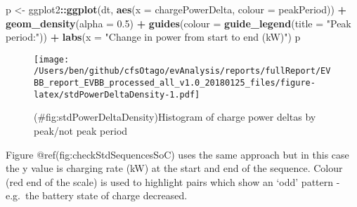 \documentclass[]{article}
\newenvironment{Shaded}{\begin{snugshade}}{\end{snugshade}}
\newcommand{\DataTypeTok}[1]{\textcolor[rgb]{0.13,0.29,0.53}{#1}}
\newcommand{\FloatTok}[1]{\textcolor[rgb]{0.00,0.00,0.81}{#1}}
\newcommand{\KeywordTok}[1]{\textcolor[rgb]{0.13,0.29,0.53}{\textbf{#1}}}
\newcommand{\NormalTok}[1]{#1}
\newcommand{\OperatorTok}[1]{\textcolor[rgb]{0.81,0.36,0.00}{\textbf{#1}}}
\newcommand{\StringTok}[1]{\textcolor[rgb]{0.31,0.60,0.02}{#1}}
\begin{document}
\begin{Shaded}
\begin{Highlighting}[]
\NormalTok{p <-}\StringTok{ }\NormalTok{ggplot2}\OperatorTok{::}\KeywordTok{ggplot}\NormalTok{(dt, }\KeywordTok{aes}\NormalTok{(}\DataTypeTok{x =}\NormalTok{ chargePowerDelta, }\DataTypeTok{colour =}\NormalTok{ peakPeriod)) }\OperatorTok{+}
\StringTok{  }\KeywordTok{geom_density}\NormalTok{(}\DataTypeTok{alpha =} \FloatTok{0.5}\NormalTok{) }\OperatorTok{+}
\StringTok{  }\KeywordTok{guides}\NormalTok{(}\DataTypeTok{colour =} \KeywordTok{guide_legend}\NormalTok{(}\DataTypeTok{title =} \StringTok{"Peak period:"}\NormalTok{)) }\OperatorTok{+}
\StringTok{  }\KeywordTok{labs}\NormalTok{(}\DataTypeTok{x =} \StringTok{"Change in power from start to end (kW)"}\NormalTok{)}
\NormalTok{p}
\end{Highlighting}
\end{Shaded}

\begin{figure}
\centering
\texttt{[image: /Users/ben/github/cfsOtago/evAnalysis/reports/fullReport/EVBB\_report\_EVBB\_processed\_all\_v1.0\_20180125\_files/figure-latex/stdPowerDeltaDensity-1.pdf]}
\caption{(\#fig:stdPowerDeltaDensity)Histogram of charge power deltas by peak/not peak period}
\end{figure}

Figure @ref(fig:checkStdSequencesSoC) uses the same approach but in this case the y value is charging rate (kW) at the start and end of the sequence. Colour (red end of the scale) is used to highlight pairs which show an `odd' pattern - e.g.~the battery state of charge decreased.
\end{document}
